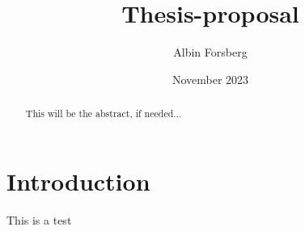 \documentclass{IEEEtran}
\title{Thesis-proposal}
\author{Albin Forsberg}
\date{November 2023}
\begin{document}
\author{
}
\maketitle

\begin{abstract}
    This will be the abstract, if needed...
\end{abstract}

\section{Introduction}

This is \autocite{appleby} a test 

\printbibliography
\end{document}
